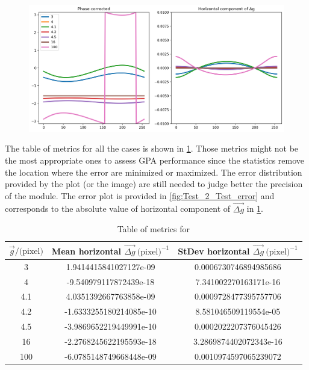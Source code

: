\documentclass[12pt, titlepage]{article}
\begin{document}
\begin{figure}[H]
\begin{center}
\includegraphics[scale=0.5]{Figures/Test_2_test_results.png}
\caption{}
\label{fig:Test_2_Test_results}
\end{center}
\end{figure}

The table of metrics for all the cases is shown in \cref{tb:Metric_test_2_multiple_cases}. Those metrics might not be the most appropriate ones to assess GPA performance since the statistics remove the location where the error are minimized or maximized. The error distribution provided by the plot (or the image) are still needed to judge better the precision of the module. The error plot is provided in \cref{fig:Test_2_Test_error} and corresponds to the absolute value of horizontal component of $\overrightarrow{\Delta g}$ in \cref{fig:Test_2_Test_results}.

\begin{table}[H]
\centering
\begin{tabular}{|c|c|c|}
\hline
$\overrightarrow{g} / \text{(pixel)}$ & Mean horizontal $\overrightarrow{\Delta g} \ \text{(pixel)}^{-1}$ & StDev horizontal $\overrightarrow{\Delta g} \ \text{(pixel)}^{-1}$ \\
\hline
3			& 1.9414415841027127e-09 & 0.0006730746894985686 \\ \hline
\cellcolor{green} 4	 & \cellcolor{green} -9.540979117872439e-18 & \cellcolor{green} 7.341002270163171e-16 \\ \hline
\cellcolor[rgb]{1,0.8,0} 4.1 & \cellcolor[rgb]{1,0.8,0} 4.0351392667763858e-09 & \cellcolor[rgb]{1,0.8,0} 0.0009728477395757706 \\ \hline
4.2			& -1.6333255180214085e-10 & 8.581046509119554e-05 \\ \hline
4.5			& -3.9869652219449991e-10 & 0.0002022207376045426 \\ \hline
\cellcolor{green} 16 & \cellcolor{green} -2.2768245622195593e-18 & \cellcolor{green} 3.2869874402072343e-16 \\ \hline
\cellcolor[rgb]{1,0.8,0} 100 & \cellcolor[rgb]{1,0.8,0} -6.0785148749668448e-09 & \cellcolor[rgb]{1,0.8,0} 0.0010974597065239072 \\ \hline
\end{tabular}
\caption{Table of metrics for}\label{tb:Metric_test_2_multiple_cases}
\end{table}
\end{document}

